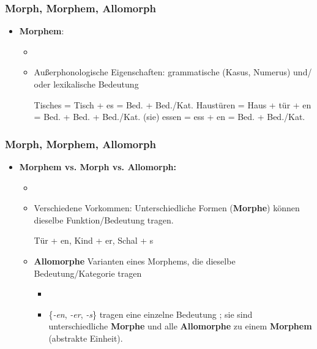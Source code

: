 \begin{frame}
\frametitle{Morph, Morphem, Allomorph}

\begin{itemize}
	\item \textbf{Morphem}:
	
	\begin{itemize}
		\item[]
		\item Außerphonologische Eigenschaften: grammatische (\zB Kasus, Numerus) und/ oder lexikalische Bedeutung
		
		  \eal
                  \ex	Tisches = Tisch + 
                  es = Bed.  + Bed./Kat. 
		  \ex	Haustüren = Haus + tür + en = Bed.  + Bed.  + Bed./Kat.  
		  \ex	(sie) essen = ess + en = Bed.  +
                  Bed./Kat. 
                  \zl
			 
	\end{itemize}
\end{itemize}


\end{frame}



\begin{frame}
\frametitle{Morph, Morphem, Allomorph}

\begin{itemize}
	\item \textbf{Morphem vs. Morph vs. Allomorph:}
	
	\begin{itemize}
		\item[]
		\item Verschiedene Vorkommen: Unterschiedliche Formen (\textbf{Morphe}) können dieselbe Funktion/Bedeutung tragen.
		
		  \ea
                  Tür + en, Kind + er, Schal + s
           \z
		
		\item \textbf{Allomorphe} \ras Varianten eines Morphems, die dieselbe Bedeutung/Kategorie tragen
		
		\begin{itemize}
			\item[]
			\item \{\emph{-en}, \emph{-er}, \emph{-s}\} tragen eine einzelne Bedeutung ; sie sind unterschiedliche \textbf{Morphe} und alle \textbf{Allomorphe} zu einem \textbf{Morphem} (abstrakte Einheit).
		\end{itemize}
	\end{itemize}
\end{itemize}


\end{frame}



